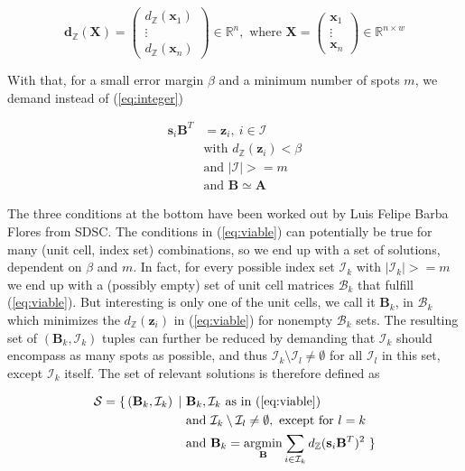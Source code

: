 \documentclass[a4paper,10pt]{article}
\DeclareMathOperator*{\argmin}{argmin}
\newcommand{\vect}[1]{\mathbf{#1}}
\newcommand{\mat}[1]{\mathbf{#1}}
\newcommand{\distZ}[1]{d_\mathbb{Z}(#1)}
\newcommand{\distvecZ}[1]{\vect{d}_\mathbb{Z}(#1)}
\begin{document}
\[
 \distvecZ{\mat{X}} = \begin{pmatrix} \distZ{\vect{x}_1} \\ \vdots \\ \distZ{\vect{x}_n} \end{pmatrix}\in \mathbb{R}^n,
 \text{ where }\mat{X} = \begin{pmatrix} \vect{x}_1 \\ \vdots \\ \vect{x}_n \end{pmatrix}\in \mathbb{R}^{n\times w}
\]


With that, for a small error margin $\beta$ and a minimum number of spots $m$, we demand instead of (\ref{eq:integer})

\begin{equation}\label{eq:viable}
 \begin{split}
  \vect{s}_i \mat{B}^T &= \vect{z}_i,\ i \in \mathcal{I} \\
  &\text{with }\distZ{\vect{z}_i} < \beta \\
  &\text{and }|\mathcal{I}| >= m \\
  &\text{and }\mat{B} \simeq \mat{A}
 \end{split}
\end{equation}

The three conditions at the bottom have been worked out by Luis Felipe Barba Flores from SDSC. The conditions in (\ref{eq:viable}) can potentially be true for many (unit cell, index set) combinations, so we end up with a set of solutions, dependent on $\beta$ and $m$. In fact, for every possible index set $\mathcal{I}_k$ with $|\mathcal{I}_k| >= m$ we end up with a (possibly empty) set of unit cell matrices $\mathcal{B}_k$ that fulfill (\ref{eq:viable}). But interesting is only one of the unit cells, we call it $\mat{B}_k$, in $\mathcal{B}_k$ which minimizes the $\distZ{\vect{z}_i}$ in (\ref{eq:viable}) for nonempty $\mathcal{B}_k$ sets. The resulting set of $(\mat{B}_k, \mathcal{I}_k)$ tuples can further be reduced by demanding that $\mathcal{I}_k$ should encompass as many spots as possible, and thus $\mathcal{I}_k \setminus \mathcal{I}_l \neq \emptyset$ for all $\mathcal{I}_l$ in this set, except $\mathcal{I}_k$ itself. The set of relevant solutions is therefore defined as

\begin{equation}\label{eq:solution-set}
 \begin{split}
  \mathcal{S} = \{\, (\mat{B}_k, \mathcal{I}_k)\,\mid\ &\mat{B}_k, \mathcal{I}_k\text{ as in (\ref{eq:viable})} \\
  &\text{and }\mathcal{I}_k \setminus \mathcal{I}_l \neq \emptyset,\text{ except for }l=k \\
  &\text{and }\mat{B}_k = \argmin_{\mat{B}} \sum_{i \in \mathcal{I}_k} \distZ{\vect{s}_i \mat{B}^T}^2\ \}
 \end{split}
\end{equation}
\end{document}

